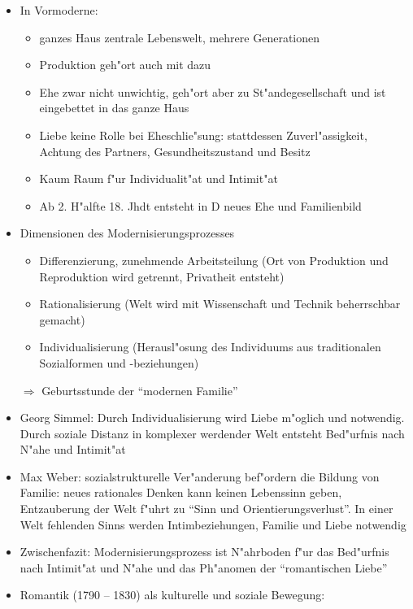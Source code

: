 \begin{itemize}
	\item
		In Vormoderne:
		\begin{itemize}
			\item
				ganzes Haus zentrale Lebenswelt, mehrere Generationen
			\item
				Produktion geh"ort auch mit dazu
			\item
				Ehe zwar nicht unwichtig, geh"ort aber zu St"andegesellschaft und ist eingebettet in das ganze Haus
			\item
				Liebe keine Rolle bei Eheschlie"sung: stattdessen Zuverl"assigkeit, Achtung des Partners, Gesundheitszustand und Besitz
			\item
				Kaum Raum f"ur Individualit"at und Intimit"at
			\item
				Ab 2. H"alfte 18. Jhdt entsteht in D neues Ehe und Familienbild
		\end{itemize}
	\item
		Dimensionen des Modernisierungsprozesses
		\begin{itemize}
			\item
				Differenzierung, zunehmende Arbeitsteilung (Ort von Produktion und Reproduktion wird getrennt, Privatheit entsteht)
			\item
				Rationalisierung (Welt wird mit Wissenschaft und Technik beherrschbar gemacht)
			\item
				Individualisierung (Herausl"osung des Individuums aus traditionalen Sozialformen und -beziehungen) 
		\end{itemize}
		$\Rightarrow$ Geburtsstunde der \enquote{modernen Familie}
	\item
		Georg Simmel: Durch Individualisierung wird Liebe m"oglich und notwendig. Durch soziale Distanz in komplexer werdender Welt entsteht Bed"urfnis nach N"ahe und Intimit"at
	\item
		Max Weber: sozialstrukturelle Ver"anderung bef"ordern die Bildung von Familie: neues rationales Denken kann keinen Lebenssinn geben, Entzauberung der Welt f"uhrt zu \enquote{Sinn und Orientierungsverlust}. In einer Welt fehlenden Sinns werden Intimbeziehungen, Familie und Liebe notwendig
	\item
		Zwischenfazit: Modernisierungsprozess ist N"ahrboden f"ur das Bed"urfnis nach Intimit"at und N"ahe und das Ph"anomen der \enquote{romantischen Liebe}
	\item
		Romantik (1790 -- 1830) als kulturelle und soziale Bewegung:
		\begin{itemize}

\end{itemize}
\end{itemize}
